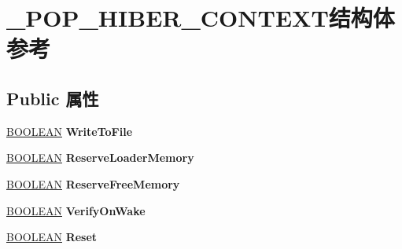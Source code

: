 \hypertarget{struct___p_o_p___h_i_b_e_r___c_o_n_t_e_x_t}{}\section{\+\_\+\+P\+O\+P\+\_\+\+H\+I\+B\+E\+R\+\_\+\+C\+O\+N\+T\+E\+X\+T结构体 参考}
\label{struct___p_o_p___h_i_b_e_r___c_o_n_t_e_x_t}
\subsection*{Public 属性}
\begin{DoxyCompactItemize}
\item 
\mbox{\label{struct___p_o_p___h_i_b_e_r___c_o_n_t_e_x_t_aa39ce816c2df7713e837f64df10ecdf4}} 
\hyperlink{_processor_bind_8h_a112e3146cb38b6ee95e64d85842e380a}{B\+O\+O\+L\+E\+AN} {\bfseries Write\+To\+File}
\item 
\mbox{\label{struct___p_o_p___h_i_b_e_r___c_o_n_t_e_x_t_a134dd78b790ee454aaf1f933b0d38791}} 
\hyperlink{_processor_bind_8h_a112e3146cb38b6ee95e64d85842e380a}{B\+O\+O\+L\+E\+AN} {\bfseries Reserve\+Loader\+Memory}
\item 
\mbox{\label{struct___p_o_p___h_i_b_e_r___c_o_n_t_e_x_t_acd81eb2d3e5a882e700ea6e2d8912520}} 
\hyperlink{_processor_bind_8h_a112e3146cb38b6ee95e64d85842e380a}{B\+O\+O\+L\+E\+AN} {\bfseries Reserve\+Free\+Memory}
\item 
\mbox{\label{struct___p_o_p___h_i_b_e_r___c_o_n_t_e_x_t_a5d6c59d31c70bbefc12e6b06dcb2201b}} 
\hyperlink{_processor_bind_8h_a112e3146cb38b6ee95e64d85842e380a}{B\+O\+O\+L\+E\+AN} {\bfseries Verify\+On\+Wake}
\item 
\mbox{\label{struct___p_o_p___h_i_b_e_r___c_o_n_t_e_x_t_a67c78e0c9405a1bcd7ace0edf346a22e}} 
\hyperlink{_processor_bind_8h_a112e3146cb38b6ee95e64d85842e380a}{B\+O\+O\+L\+E\+AN} {\bfseries Reset}
\item 
\mbox{\label{struct___p_o_p___h_i_b_e_r___c_o_n_t_e_x_t_a09f1b232f15f6e374c2de5516a04b942}} 

\end{DoxyCompactItemize}

